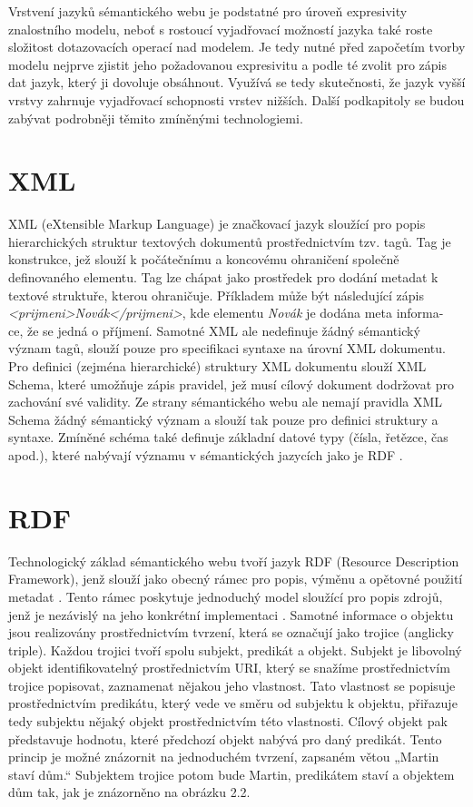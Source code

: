 \documentclass{projekt}
\begin{document}
Vrstvení jazyků sémantického webu je podstatné pro úroveň expresivity znalostního modelu, neboť s rostoucí vyjadřovací možností jazyka také roste složitost dotazovacích operací nad modelem. Je tedy nutné před započetím tvorby modelu nejprve zjistit jeho požadovanou expresivitu a podle té zvolit pro zápis dat jazyk, který ji dovoluje obsáhnout. Využívá se tedy skutečnosti, že jazyk vyšší vrstvy zahrnuje vyjadřovací schopnosti vrstev nižších\cite{_2}. Další podkapitoly se budou zabývat podrobněji těmito zmíněnými technologiemi.


\section{XML}
\hspace{0.65cm}XML (eXtensible Markup Language) je značkovací jazyk sloužící pro popis hierarchických struktur textových dokumentů prostřednictvím tzv. tagů. Tag je konstrukce, jež slouží k počátečnímu a koncovému ohraničení společně definovaného elementu. Tag lze chápat jako prostředek pro dodání metadat k textové struktuře, kterou ohraničuje. Příkladem může být následující zápis {\it <prijmeni>Novák</prijmeni>}, kde elementu {\it Novák} je dodána meta informa-\\ce, že se jedná o příjmení. Samotné XML ale nedefinuje žádný sémantický význam tagů, slouží pouze pro specifikaci syntaxe na úrovní XML dokumentu. Pro definici (zejména hierarchické) struktury XML dokumentu slouží XML Schema, které umožňuje zápis pravidel, jež musí cílový dokument dodržovat pro zachování své validity. Ze strany sémantického webu ale nemají pravidla XML Schema žádný sémantický význam a slouží tak pouze pro definici struktury a syntaxe. Zmíněné schéma také definuje základní datové typy (čísla, řetězce, čas apod.), které nabývají významu v sémantických jazycích jako je RDF \cite{_3}.


\section{RDF}
\hspace{0.65cm}Technologický základ sémantického webu tvoří jazyk RDF (Resource Description Framework), jenž slouží jako obecný rámec pro popis, výměnu a opětovné použití metadat \cite{_33}. Tento rámec poskytuje jednoduchý model sloužící pro popis zdrojů, jenž je nezávislý na jeho konkrétní implementaci \cite{_4}. Samotné informace o objektu jsou realizovány prostřednictvím tvrzení, která se označují jako trojice (anglicky triple). Každou trojici tvoří spolu subjekt, predikát a objekt. Subjekt je libovolný objekt identifikovatelný prostřednictvím URI, který se snažíme prostřednictvím trojice popisovat, zaznamenat nějakou jeho vlastnost. Tato vlastnost se popisuje prostřednictvím predikátu, který vede ve směru od subjektu k objektu, přiřazuje tedy subjektu nějaký objekt prostřednictvím této vlastnosti. Cílový objekt pak představuje hodnotu, které předchozí objekt nabývá pro daný predikát. 
Tento princip je možné znázornit na jednoduchém tvrzení, zapsaném větou „Martin staví dům.“ Subjektem trojice potom bude Martin, predikátem staví a objektem dům tak, jak je znázorněno na obrázku 2.2. 
\\
\vspace{0.1cm}
\end{document}
